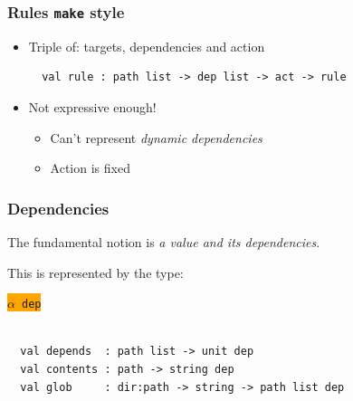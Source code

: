 \documentclass{beamer}
\begin{document}


\begin{frame}[fragile]
\frametitle{Rules {\tt make} style}
\begin{itemize}
\item Triple of: targets, dependencies and action
{\footnotesize
\begin{verbatim}
  val rule : path list -> dep list -> act -> rule

\end{verbatim}}
\item Not expressive enough!
\begin{itemize}
\item Can't represent {\em dynamic dependencies}
\item Action is fixed
\end{itemize}
\end{itemize}
\end{frame}



\begin{frame}[fragile]
\frametitle{Dependencies}
The fundamental notion is {\it a value and its dependencies}. \par
This is represented by the type:
\begin{center}\colorbox{orange}{$\alpha$\ {\tt dep}}\end{center}
{\footnotesize
\begin{verbatim}

  val depends  : path list -> unit dep
  val contents : path -> string dep
  val glob     : dir:path -> string -> path list dep

\end{verbatim}}
\end{frame}


%
\end{document}
